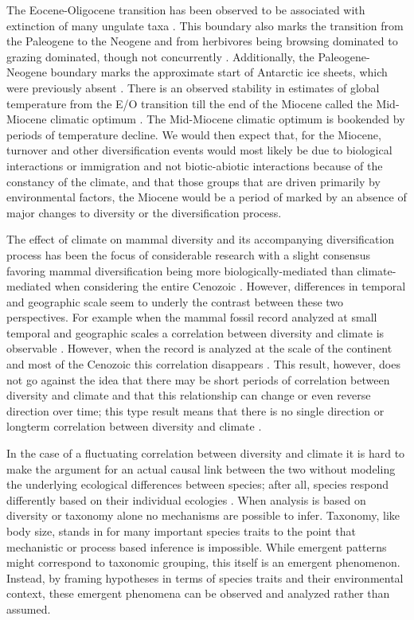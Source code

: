 \documentclass[12pt,letterpaper]{article}
\begin{document}
The Eocene-Oligocene transition has been observed to be associated with extinction of many ungulate taxa \citep{Janis2008a}. This boundary also marks the transition from the Paleogene to the Neogene and from herbivores being browsing dominated to grazing dominated, though not concurrently \citep{Janis1993b,Stromberg2005}. Additionally, the Paleogene-Neogene boundary marks the approximate start of Antarctic ice sheets, which were previously absent \citep{Zachos2008}. There is an observed stability in estimates of global temperature from the E/O transition till the end of the Miocene called the Mid-Miocene climatic optimum \citep{Zachos2001,Zachos2008}. The Mid-Miocene climatic optimum is bookended by periods of temperature decline. We would then expect that, for the Miocene, turnover and other diversification events would most likely be due to biological interactions or immigration and not biotic-abiotic interactions because of the constancy of the climate, and that those groups that are driven primarily by environmental factors, the Miocene would be a period of marked by an absence of major changes to diversity or the diversification process.

The effect of climate on mammal diversity and its accompanying diversification process has been the focus of considerable research with a slight consensus favoring mammal diversification being more biologically-mediated than climate-mediated when considering the entire Cenozoic \citep{Alroy2000g,Figueirido2012,Clyde1998a}. However, differences in temporal and geographic scale seem to underly the contrast between these two perspectives. For example when the mammal fossil record analyzed at small temporal and geographic scales a correlation between diversity and climate is observable \citep{Clyde1998a}. However, when the record is analyzed at the scale of the continent and most of the Cenozoic this correlation disappears \citep{Alroy2000g}. This result, however, does not go against the idea that there may be short periods of correlation between diversity and climate and that this relationship can change or even reverse direction over time; this type result means that there is no single direction or longterm correlation between diversity and climate \citep{Figueirido2012}. 

In the case of a fluctuating correlation between diversity and climate it is hard to make the argument for an actual causal link between the two without modeling the underlying ecological differences between species; after all, species respond differently based on their individual ecologies \citep{Blois2009}. When analysis is based on diversity or taxonomy alone no mechanisms are possible to infer. Taxonomy, like body size, stands in for many important species traits to the point that mechanistic or process based inference is impossible. While emergent patterns might correspond to taxonomic grouping, this itself is an emergent phenomenon. Instead, by framing hypotheses in terms of species traits and their environmental context, these emergent phenomena can be observed and analyzed rather than assumed.
\end{document}
